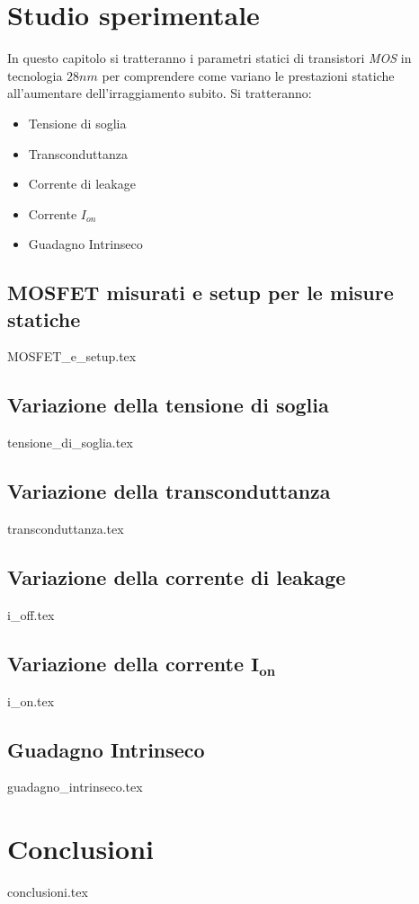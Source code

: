 \documentclass[
	a4paper,
	cleardoublepage=empty,
	headings=twolinechapter,
	numbers=autoenddot,
]{scrbook}
\begin{document}
\chapter{Studio sperimentale}
In questo capitolo si tratteranno i parametri statici di transistori \emph{MOS} in tecnologia $28 nm$ per comprendere come variano le prestazioni statiche all'aumentare dell'irraggiamento subito. Si tratteranno:
\begin{itemize}
  \item Tensione di soglia
  \item Transconduttanza
  \item Corrente di leakage
  \item Corrente $I_{on}$
  \item Guadagno Intrinseco
\end{itemize}

\section{MOSFET misurati e setup per le misure statiche}
{MOSFET_e_setup.tex}

\section{Variazione della tensione di soglia}
\label{cap2:vth}
{tensione_di_soglia.tex}

\section{Variazione della transconduttanza}\label{sec:transconduttanza}
{transconduttanza.tex}

\section{Variazione della corrente di leakage}
{i_off.tex}

\section[Variazione della corrente $I_{on}$]{Variazione della corrente $\bm{I_{on}}$}
{i_on.tex}

\section{Guadagno Intrinseco}
{guadagno_intrinseco.tex}


\chapter*{Conclusioni}
{conclusioni.tex}

\backmatter




\end{document}
